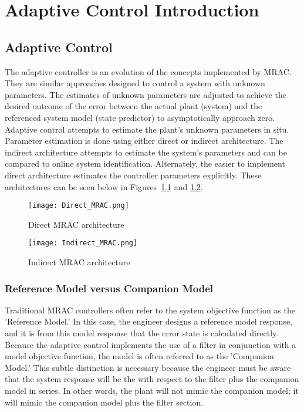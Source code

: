 \chapter{\Lone Adaptive Control Introduction}\label{ch:derivation}

\section{\Lone Adaptive Control}
The \Lone adaptive controller is an evolution of the concepts implemented by \ac{MRAC}.  They are similar approaches designed to control a system with unknown parameters.  The estimates of unknown parameters are adjusted to achieve the desired outcome of the error between the actual plant (system) and the referenced system model (state predictor) to asymptotically approach zero.   Adaptive control attempts to estimate the plant's unknown parameters in situ.  Parameter estimation is done using either direct or indirect architecture.  The indirect architecture attempts to estimate the system's parameters and can be compared to online system identification.  Alternately, the easier to implement direct architecture estimates the controller parameters explicitly.  These architectures can be seen below in Figures~\ref{fig:direct_mrac} and \ref{fig:indirect_mrac}.

\begin{figure}[h!]
 \centering
  \texttt{[image: Direct\_MRAC.png]}
  \caption{Direct \ac{MRAC} architecture }
  \label{fig:direct_mrac}
\end{figure}

\begin{figure}[h!]
 \centering
  \texttt{[image: Indirect\_MRAC.png]}
  \caption{Indirect \ac{MRAC} architecture }
  \label{fig:indirect_mrac}
\end{figure}

\subsection{Reference Model versus Companion Model}
Traditional \ac{MRAC} controllers often refer to the system objective function as the 'Reference Model.'  In this case, the engineer designs a reference model response, and it is from this model response that the error state is calculated directly.  Because the \Lone adaptive control implements the use of a filter in conjunction with a model objective function, the model is often referred to as the 'Companion Model.'  This subtle distinction is necessary because the engineer must be aware that the system response will be the with respect to the filter plus the companion model in series.  In other words, the plant will not mimic the companion model; it will mimic the companion model plus the filter section.

